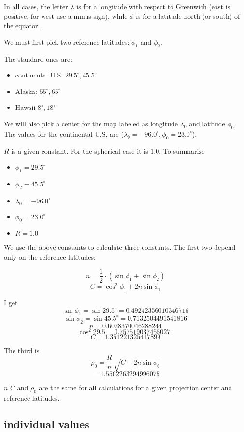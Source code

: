 \documentclass[11pt, oneside]{article}
\begin{document}
In all cases, the letter $\lambda$ is for a longitude with respect to Greenwich (east is positive, for west use a minus sign), while $\phi$ is for a latitude north (or south) of the equator.

We must first pick two reference latitudes:  $\phi_1$ and $\phi_2$.

The standard ones are:

\begin{itemize}
\item continental U.S. $29.5^{\circ}, 45.5^{\circ}$
\item Alaska: $55^{\circ}, 65^{\circ}$
\item Hawaii $8^{\circ},18^{\circ}$
\end{itemize}

We will also pick a center for the map labeled as longitude $\lambda_0$ and latitude $\phi_0$.  The values for the continental U.S. are ($\lambda_0 = -96.0^{\circ}, \phi_0 = 23.0^{\circ}$).

$R$ is a given constant.  For the spherical case it is $1.0$.  To summarize

\begin{itemize}
\item $\phi_1 = 29.5^{\circ}$
\item $\phi_2 = 45.5^{\circ}$
\item $\lambda_0 = -96.0^{\circ}$
\item $\phi_0 = 23.0^{\circ}$
\item $R = 1.0$
\end{itemize}

We use the above constants to calculate three constants.  The first two depend only on the reference latitudes:

\[ n = \frac{1}{2} \cdot (\sin \phi_1 + \sin \phi_2) \]
\[ C = \cos^2 \phi_1 + 2n \sin \phi_1 \]

I get
\[ \sin \phi_1 = \sin 29.5^{\circ} = 0.49242356010346716 \]
\[ \sin \phi_2 = \sin 45.5^{\circ} = 0.7132504491541816 \]
\[ n = 0.6028370046288244 \]
\[ \cos^2 29.5 = 0.7575190374550271 \]
\[ C = 1.351221325417899 \]

The third is
\[ \rho_0 =  \frac{R}{n} \ \sqrt{C - 2n \sin \phi_0} \]
\[ = 1.5562263294996075 \]

$n$ $C$ and $\rho_0$ are the same for all calculations for a given projection center and reference latitudes.

\subsection*{individual values}
\end{document}
